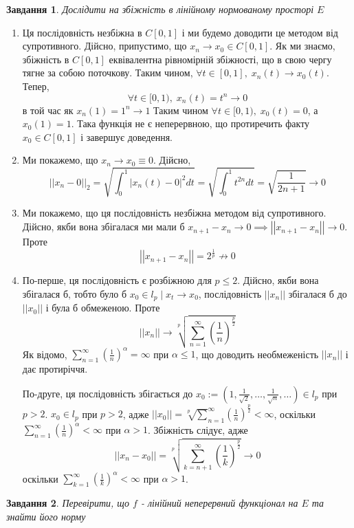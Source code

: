 \documentclass[12pt]{article} %
\newcommand{\mynorm}[1]{\left|\left|#1\right|\right|}
\newcommand{\myabs}[1]{\left|#1\right|}
\newtheorem{prob}{Завдання}
\begin{document}
\begin{prob}
	Дослідити на збіжність в лінійному нормованому просторі $E$
\end{prob}
	\begin{enumerate}
		\item{Ця послідовність незбіжна в $C[0,1]$ і ми будемо доводити це методом від супротивного. Дійсно,
			припустимо, що $x_n\to x_0\in C[0,1]$. Як ми знаємо, збіжність в $C[0,1]$ еквівалентна
			рівномірній збіжності, що в свою чергу тягне за собою поточкову. Таким чином,
			$\forall t\in[0,1],\; x_n(t)\to x_0(t)$. Тепер,
			\[\forall t\in[0,1),\; x_n(t)=t^n\to 0\]
			в той час як
			$x_n(1)=1^n\to 1$
			Таким чином $\forall t\in[0,1),\; x_0(t)=0$, а $x_0(1)=1$. Така
			функція не є неперервною, що протиречить факту $x_0\in C[0,1]$ і завершує доведення.}
		\item{Ми покажемо, що $x_n\to x_0\equiv 0$. Дійсно,
			\[\mynorm{x_n-0}_2=\sqrt{\int_0^1 \myabs{x_n(t)-0}^2dt}=\sqrt{\int_0^1 t^{2n}dt}=\sqrt{\frac{1}{2n+1}}\to 0\]
			}
		\item{Ми покажемо, що ця послідовність незбіжна методом від супротивного. Дійсно, якби вона збігалася ми мали б $x_{n+1}-x_n\to 0
			\implies \mynorm{x_{n+1}-x_n}\to 0$. Проте
			\[\mynorm{x_{n+1}-x_n}=2^{\frac{1}{p}}\nrightarrow  0\]
			}
		\item{По-перше, ця послідовність є розбіжною для $p\leq 2$. Дійсно, якби вона збігалася б, тобто було б $x_0\in l_p\mid
			x_t\to x_0$, послідовність $\mynorm{x_n}$ збігалася б до $\mynorm{x_0}$ і була б обмеженою. Проте
			\[\mynorm{x_n}\to\sqrt[p]{\sum_{n=1}^\infty (\frac{1}{n})^{\frac{p}{2}}}\]
			Як відомо, $\sum_{n=1}^\infty (\frac{1}{n})^\alpha=\infty$ при $\alpha\leq 1$, що доводить необмеженість $\mynorm{x_n}$
			і дає протиріччя.
			
			По-друге, ця послідовність збігається до $x_0:=(1,\frac{1}{\sqrt{2}},\dots,\frac{1}{\sqrt{n}},\dots)\in l_p$
			при $p>2$. $x_0\in l_p$ при $p>2$, адже
			$\mynorm{x_0}=\sqrt[p]\sum_{n=1}^\infty (\frac{1}{n})^{\frac{p}{2}}<\infty$, оскільки 
			$\sum_{n=1}^\infty (\frac{1}{n})^\alpha<\infty$ при $\alpha>1$.
			Збіжність слідує, адже
			\[\mynorm{x_n-x_0}=\sqrt[p]{\sum_{k=n+1}^\infty (\frac{1}{k})^{\frac{p}{2}}}\to 0\]
			оскільки 
			$\sum_{k=1}^\infty (\frac{1}{k})^\alpha<\infty$ при $\alpha>1$.
			}
	\end{enumerate}
\begin{prob}
	Перевірити, що $f$ - лінійний неперервний функціонал на $E$ та знайти його норму
\end{prob}
\end{document}
